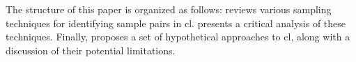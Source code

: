 The structure of this paper is organized as follows:
 reviews various sampling techniques for identifying sample pairs in \ac{cl}.
 presents a critical analysis of these techniques. 
Finally,  proposes a set of hypothetical approaches to \ac{cl}, 
along with a discussion of their potential limitations.